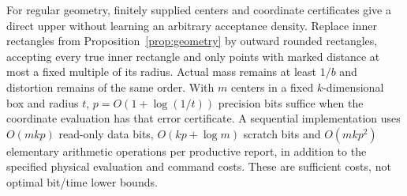 For regular geometry, finitely supplied centers and coordinate certificates give a direct upper without learning an arbitrary acceptance density. Replace inner rectangles from Proposition~\ref{prop:geometry} by outward rounded rectangles, accepting every true inner rectangle and only points with marked distance at most a fixed multiple of its radius. Actual mass remains at least $1/b$ and distortion remains of the same order. With $m$ centers in a fixed $k$-dimensional box and radius $t$, $p=O(1+\log(1/t))$ precision bits suffice when the coordinate evaluation has that error certificate. A sequential implementation uses $O(mkp)$ read-only data bits, $O(kp+\log m)$ scratch bits and $O(mkp^2)$ elementary arithmetic operations per productive report, in addition to the specified physical evaluation and command costs. These are sufficient costs, not optimal bit/time lower bounds.

